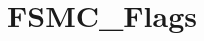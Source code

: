 \hypertarget{group___f_s_m_c___flags}{\section{F\-S\-M\-C\-\_\-\-Flags}
\label{group___f_s_m_c___flags}
}
